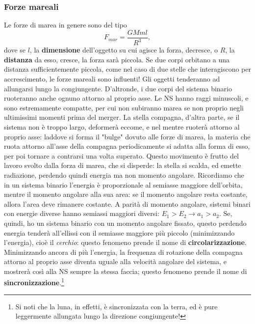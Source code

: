 \subsubsection{Forze mareali}
Le forze di marea in genere sono del tipo
\begin{equation}
    F_{mar} = \frac{GMml}{R^3},
    \label{eq: forze mareali}
\end{equation}
dove se $l$, la \textbf{dimensione} dell'oggetto su cui agisce la forza, decresce, o $R$, la \textbf{distanza} da esso, cresce, la forza sarà piccola.
Se due corpi orbitano a una distanza sufficientemente piccola, come nel caso di due stelle che interagiscono per accrescimento, le forze mareali sono influenti!
Gli oggetti tenderanno ad allungarsi lungo la congiungente.
D'altronde, i due corpi del sistema binario ruoteranno anche ognuno attorno al proprio asse.
Le NS hanno raggi minuscoli, e sono estremamente compatte, per cui non subiranno marea se non proprio negli ultimissimi momenti prima del merger.
La stella compagna, d'altra parte, se il sistema non è troppo largo, deformerà eccome, e nel mentre ruoterà attorno al proprio asse:
laddove si forma il "bulge" dovuto alle forze di marea, la materia che ruota attorno all'asse della compagna periodicamente si adatta alla forma di esso, per poi tornare a contrarsi una volta superato.
Questo movimento è frutto del lavoro svolto dalla forza di marea, che si disperde: la stella si scalda, ed emette radiazione, perdendo quindi energia ma non momento angolare.
Ricordiamo che in un sistema binario l'energia è proporzionale al semiasse maggiore dell'orbita, mentre il momento angolare alla sua area: se il momento angolare resta costante, allora l'area deve rimanere costante.
A parità di momento angolare, sistemi binari con energie diverse hanno semiassi maggiori diversi: $E_1>E_2 \xrightarrow{} a_1>a_2$.
Se, quindi, ho un sistema binario con un momento angolare fissato, questo perdendo energia tenderà all'ellissi con il semiasse maggiore più piccolo (minimizzando l'energia), cioè il \textit{cerchio}: questo fenomeno prende il nome di \textbf{circolarizzazione}.
Minimizzando ancora di più l'energia, la frequenza di rotazione della compagna attorno al proprio asse diventa uguale alla velocità angolare del sistema, e mostrerà così alla NS sempre la stessa faccia; questo fenomeno prende il nome di \textbf{sincronizzazione}.\footnote{Si noti che la luna, in effetti, è sincronizzata con la terra, ed è pure leggermente allungata lungo la direzione congiungente!}

